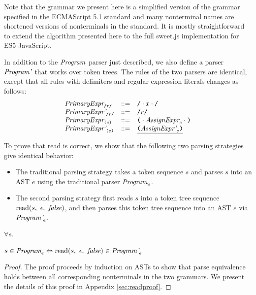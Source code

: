 \documentclass[preprint,10pt]{sigplanconf}
\begin{document}
Note that the grammar we present here is a simplified version of the
grammar specified in the ECMAScript 5.1 standard \cite{International2011}
and many nonterminal names are shortened
versions of nonterminals in the standard.
It is mostly straightforward to extend the algorithm
presented here 
to 
the full sweet.js implementation for ES5 JavaScript.

In addition to the \( \textit{Program}_{} \) parser just described, we
also define a parser \( \textit{Program'}_{} \) that works over token
trees. The rules of the two parsers are identical, except that
all rules with delimiters and regular expression literals changes as follows:
\[
\begin{array}{lcl}
  \textit{PrimaryExpr}_{\texttt{/}r\texttt{/}} &::=& \texttt{/}\cdot x \cdot \texttt{/}
  \\
  \textit{PrimaryExpr'}_{\texttt{/}r\texttt{/}} &::=& \texttt{/}r\texttt{/}
  \\
  \textit{PrimaryExpr}_{\texttt{(} e \texttt{)}} &::=& 
  \texttt{(} \cdot \textit{AssignExpr}_{e} \cdot \texttt{)}
  \\
  \textit{PrimaryExpr'}_{\texttt{(} e \texttt{)}} &::=& 
  \underline{ \texttt{(} \textit{AssignExpr'}_{e} \texttt{)}}
  \\
\end{array}
\]

To prove that read is correct, we show that the following two parsing
strategies give identical behavior:
\begin{itemize}
\item The traditional parsing strategy takes a token sequence \( s
  \) and parses \( s \) into an AST \( e \) using the traditional parser
  \( \textit{Program}_{e} \).

\item The second parsing strategy first reads \( s \) into a token
  tree sequence \( \textrm{read}(s,~\epsilon,~\textit{false}) \), and then parses
  this token tree sequence into an AST \( e \) via \( \textit{Program'}_{e} \).
\end{itemize}

\begin{theorem}\mbox{}

  \( \forall s. \)

  \( s \in \textit{Program}_{e} \Leftrightarrow 
  \textrm{read}(s,~\epsilon,~\textit{false}) \in \textit{Program'}_{e} \)

\end{theorem}
\begin{proof}\mbox{}
The proof proceeds by induction on ASTs to show that parse equivalence holds between all corresponding nonterminals in the two grammars. We present the details of this proof in Appendix \ref{sec:readproof}.
\end{proof}
\end{document}
